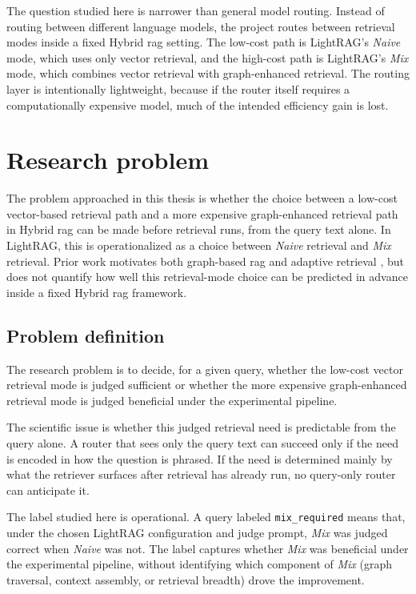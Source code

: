 \documentclass[english, bibtex]{kththesis}               %
\numberwithin{listing}{chapter}
\begin{document}
The question studied here is narrower than general model routing. Instead of routing between different language models, the project routes between retrieval modes inside a fixed Hybrid \gls{rag} setting. The low-cost path is LightRAG's \emph{Naive} mode, which uses only vector retrieval, and the high-cost path is LightRAG's \emph{Mix} mode, which combines vector retrieval with graph-enhanced retrieval. The routing layer is intentionally lightweight, because if the router itself requires a computationally expensive model, much of the intended efficiency gain is lost.

\section{Research problem}
\label{sec:problem}

The problem approached in this thesis is whether the choice between a low-cost vector-based retrieval path and a more expensive graph-enhanced retrieval path in Hybrid \gls{rag} can be made before retrieval runs, from the query text alone. In LightRAG, this is operationalized as a choice between \emph{Naive} retrieval and \emph{Mix} retrieval. Prior work motivates both graph-based \gls{rag} and adaptive retrieval \cite{edge2024graphrag,lightrag2024,jeong2024adaptiverag,asai2023selfrag}, but does not quantify how well this retrieval-mode choice can be predicted in advance inside a fixed Hybrid \gls{rag} framework.

\subsection{Problem definition}
\label{sec:problemDefinition}

The research problem is to decide, for a given query, whether the low-cost vector retrieval mode is judged sufficient or whether the more expensive graph-enhanced retrieval mode is judged beneficial under the experimental pipeline.

The scientific issue is whether this judged retrieval need is predictable from the query alone. A router that sees only the query text can succeed only if the need is encoded in how the question is phrased. If the need is determined mainly by what the retriever surfaces after retrieval has already run, no query-only router can anticipate it.

The label studied here is operational. A query labeled \texttt{mix\_required} means that, under the chosen LightRAG configuration and judge prompt, \emph{Mix} was judged correct when \emph{Naive} was not. The label captures whether \emph{Mix} was beneficial under the experimental pipeline, without identifying which component of \emph{Mix} (graph traversal, context assembly, or retrieval breadth) drove the improvement.
\end{document}
